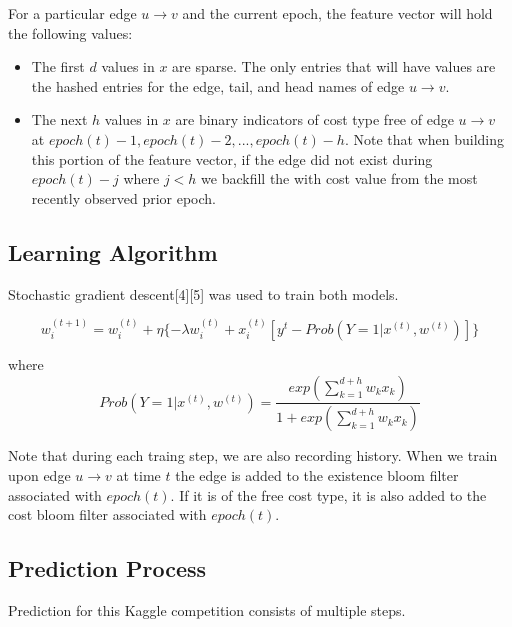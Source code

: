 \documentclass{article} %
\begin{document}
For a particular edge $u \rightarrow v$ and the current epoch, the feature
vector will hold the following values:
\begin{itemize}
\item The first $d$ values in $x$ are sparse.  The only entries that will
  have values are the hashed entries for the edge, tail, and head names of
  edge $u \rightarrow v$.
\item The next $h$ values in $x$ are binary indicators of cost type free of
  edge $u \rightarrow v$ at  $epoch(t)-1, epoch(t)-2, ..., epoch(t)-h$.  Note that when building
  this portion of the feature vector, if the edge did not exist during
  $epoch(t)-j$ where $j < h$ we backfill the with cost value from the most
  recently observed prior epoch.
\end{itemize}

\subsection{Learning Algorithm}

Stochastic gradient descent[4][5] was used to train both models.

\begin{displaymath}
w_i^{(t+1)} = w_i^{(t)} + \eta \{- \lambda w_i^{(t)} + x_i^{(t)} [ y^t -  Prob(Y=1|x^{(t)},w^{(t)})] \}
\end{displaymath}

where
\begin{displaymath}
Prob(Y=1|x^{(t)},w^{(t)}) = \frac{exp(\sum_{k=1}^{d+h} w_kx_k)}{1+exp(\sum_{k=1}^{d+h} w_kx_k)}
\end{displaymath}

Note that during each traing step, we are also recording history.  When we
train upon edge $u \rightarrow v$ at time $t$ the edge is added to the
existence bloom filter associated with $epoch(t)$.  If it is of the free
cost type, it is also added to the cost bloom filter associated with
$epoch(t)$.

\subsection{Prediction Process}
\label{sec-pred}

Prediction for this Kaggle competition consists of multiple steps.
\end{document}
